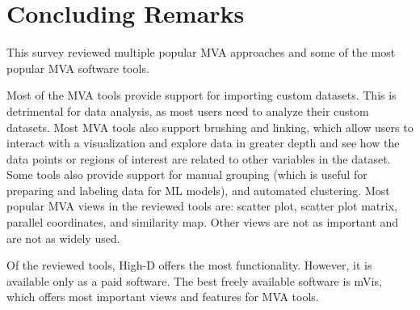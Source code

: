 %
%
% 
% 
% 


\chapter{Concluding Remarks}

\label{chap:Concl}



This survey reviewed multiple popular MVA approaches and some of the most
popular MVA software tools.

Most of the MVA tools provide support for importing custom datasets. This
is detrimental for data analysis, as most users need to analyze their
custom datasets. Most MVA tools also support brushing and linking, which
allow users to interact with a visualization and explore data in greater
depth and see how the data points or regions of interest are related to
other variables in the dataset. Some tools also provide support for manual
grouping (which is useful for preparing and labeling data for ML models),
and automated clustering. Most popular MVA views in the reviewed tools
are: scatter plot, scatter plot matrix, parallel coordinates, and
similarity map. Other views are not as important and are not as widely
used.

Of the reviewed tools, High-D offers the most functionality. However, it
is available only as a paid software. The best freely available software
is mVis, which offers most important views and features for MVA tools.

